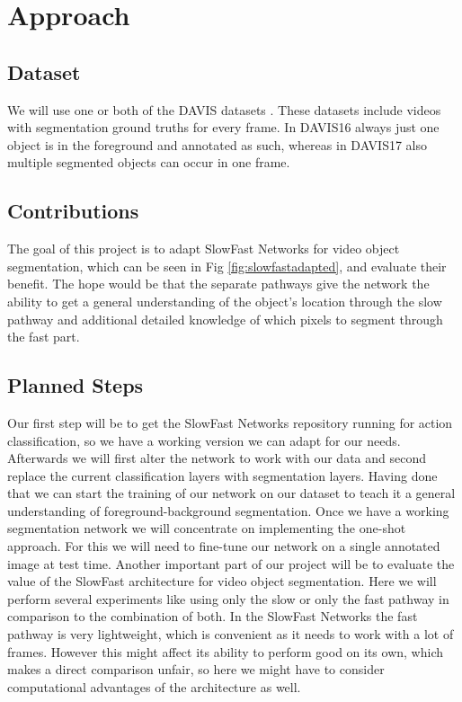 \documentclass[conference]{IEEEtran}
\begin{document}
\section{Approach}
\subsection{Dataset}
We will use one or both of the DAVIS datasets \cite{davis_2016,davis_2017}. These datasets include videos with segmentation ground truths for every frame. In DAVIS16 always just one object is in the foreground and annotated as such, whereas in DAVIS17 also multiple segmented objects can occur in one frame. 
\subsection{Contributions}
The goal of this project is to adapt SlowFast Networks for video object segmentation, which can be seen in Fig \ref{fig:slowfastadapted}, and evaluate their benefit. The hope would be that the separate pathways give the network the ability to get a general understanding of the object’s location through the slow pathway and additional detailed knowledge of which pixels to segment through the fast part.


\subsection{Planned Steps}
Our first step will be to get the SlowFast Networks repository running for action classification, so we have a working version we can adapt for our needs. Afterwards  we will first alter the network to work with our data and second replace the current classification layers with segmentation layers. Having done that we can start the training of our network on our dataset to teach it a general understanding of foreground-background segmentation.
Once we have a working segmentation network we will concentrate on implementing the one-shot approach. For this we will need to fine-tune our network on a single annotated image at test time.
Another important part of our project will be to evaluate the value of the SlowFast architecture for video object segmentation. Here we will perform several experiments like using only the slow or only the fast pathway in comparison to the combination of both. In the SlowFast Networks the fast pathway is very lightweight, which is convenient as it needs to work with a lot of frames. However this might affect its ability to perform good on its own, which makes a direct comparison unfair, so here we might have to consider computational advantages of the architecture as well.
\end{document}
